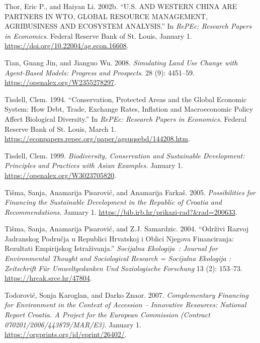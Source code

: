 \begin{CSLReferences}{1}{1}
Thor, Eric P., and Haiyan Li. 2002b. {``U.S. AND WESTERN CHINA ARE
PARTNERS IN WTO, GLOBAL RESOURCE MANAGEMENT, AGRIBUSINESS AND ECOSYSTEM
ANALYSIS.''} In \emph{RePEc: Research Papers in Economics}. Federal
Reserve Bank of St. Louis, January 1.
\url{https://doi.org/10.22004/ag.econ.16608}.

Tian, Guang Jin, and Jianguo Wu. 2008. \emph{Simulating Land Use Change
with Agent-Based Models: Progress and Prospects}. 28 (9): 4451--59.
\url{https://openalex.org/W2355278297}.

Tisdell, Clem. 1994. {``Conservation, Protected Areas and the Global
Economic System: How Debt, Trade, Exchange Rates, Inflation and
Macroeconomic Policy Affect Biological Diversity.''} In \emph{RePEc:
Research Papers in Economics}. Federal Reserve Bank of St. Louis, March
1. \url{https://econpapers.repec.org/paper/agsuqsebd/144208.htm}.

Tisdell, Clem. 1999. \emph{Biodiversity, Conservation and Sustainable
Development: Principles and Practices with Asian Examples.} January 1.
\url{https://openalex.org/W3023705820}.

Tišma, Sanja, Anamarija Pisarović, and Anamarija Farkaš. 2005.
\emph{Possibilities for Financing the Sustainable Development in the
Republic of Croatia and Recommendations}. January 1.
\url{https://bib.irb.hr/prikazi-rad?&rad=200633}.

Tišma, Sanja, Anamarija Pisarović, and Z.J. Samardzic. 2004. {``Održivi
Razvoj Jadranskog Područja u Republici Hrvatskoj i Oblici Njegova
Financiranja: Rezultati Empirijskog Istraživanja.''} \emph{Socijalna
Ekologija~: Journal for Environmental Thought and Sociological Research
= Socijalna Ekologija : Zeitschrift Für Umweltgedanken Und Soziologische
Forschung} 13 (2): 153--73. \url{https://hrcak.srce.hr/47804}.

Todorović, Sonja Karoglan, and Darko Znaor. 2007. \emph{Complementary
Financing for Environment in the Context of Accession -- Innovative
Resources: National Report Croatia. A Project for the European
Commission (Contract 070201/2006/443879/MAR/E3)}. January 1.
\url{https://orgprints.org/id/eprint/26402/}.


\end{CSLReferences}
